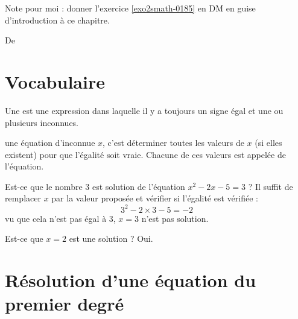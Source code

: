 
Note pour moi : donner l'exercice \ref{exo2smath-0185} en DM en guise d'introduction à ce chapitre.


De \cite{NRHooXFvgpp4}

\section{Vocabulaire}

\begin{definition}
    Une  est une expression dans laquelle il y a toujours un signe égal et une ou plusieurs inconnues.
\end{definition}

\begin{definition}
     une équation d'inconnue \( x\), c'est déterminer toutes les valeurs de \( x\) (si elles existent) pour que l'égalité soit vraie. Chacune de ces valeurs est appelée  de l'équation.
\end{definition}

\begin{example}
    Est-ce que le nombre \( 3\) est solution de l'équation \(  x^2-2x-5=3  \) ? Il suffit de remplacer \( x\) par la valeur proposée et vérifier si l'égalité est vérifiée :
    \begin{equation}
        3^2-2\times 3-5=-2
    \end{equation}
    vu que cela n'est pas égal à \( 3\), \( x=3\) n'est pas solution.

    Est-ce que \( x=2\) est une solution ? Oui.
\end{example}

\section{Résolution d'une équation du premier degré}

